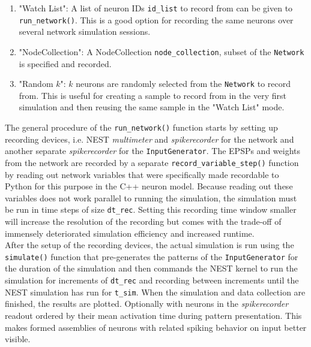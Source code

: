 \begin{enumerate}
    \item "Watch List": A list of neuron IDs \texttt{id\_list} to record from can be given to \texttt{run\_network()}. This is a good option for recording the same neurons over several network simulation sessions.
    \item "NodeCollection": A NodeCollection \texttt{node\_collection}, subset of the \texttt{Network} is specified and recorded.
    \item "Random $k$": $k$ neurons are randomly selected from the \texttt{Network} to record from. This is useful for creating a sample to record from in the very first simulation and then reusing the same sample in the "Watch List" mode.   
\end{enumerate} 
The general procedure of the \texttt{run\_network()} function starts by setting up recording devices, i.e. NEST \textit{multimeter} and \textit{spikerecorder} for the network and another separate \textit{spikerecorder} for the \texttt{InputGenerator}. The EPSPs and weights from the network are recorded by a separate \texttt{record\_variable\_step()} function by reading out network variables that were specifically made recordable to Python for this purpose in the C++ neuron model. Because reading out these variables does not work parallel to running the simulation, the simulation must be run in time steps of size \texttt{dt\_rec}. Setting this recording time window smaller will increase the resolution of the recording but comes with the trade-off of immensely deteriorated simulation efficiency and increased runtime.\\
After the setup of the recording devices, the actual simulation is run using the \texttt{simulate()} function that pre-generates the patterns of the \texttt{InputGenerator} for the duration of the simulation and then commands the NEST kernel to run the simulation for increments of \texttt{dt\_rec} and recording between increments until the NEST simulation has run for \texttt{t\_sim}. When the simulation and data collection are finished, the results are plotted. Optionally with neurons in the \textit{spikerecorder} readout ordered by their mean activation time during pattern presentation. This makes formed assemblies of neurons with related spiking behavior on input better visible.

